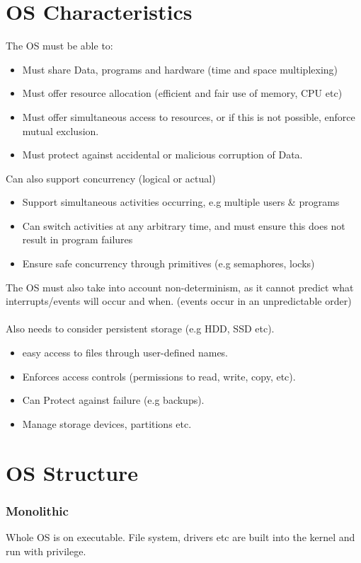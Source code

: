 \documentclass{report}
\begin{document}
    \section*{OS Characteristics}
        The OS must be able to:
        \begin{itemize}
            \item Must share Data, programs and hardware (time and space multiplexing)
            \item Must offer resource allocation (efficient and fair use of memory, CPU etc)
            \item Must offer simultaneous access to resources, or if this is not possible, enforce mutual exclusion.
            \item Must protect against accidental or malicious corruption of Data.
        \end{itemize}
        Can also support concurrency (logical or actual)
        \begin{itemize}
            \item Support simultaneous activities occurring, e.g multiple users \& programs 
            \item Can switch activities at any arbitrary time, and must ensure this does not result in program failures
            \item Ensure safe concurrency through primitives (e.g semaphores, locks)
        \end{itemize}
        The OS must also take into account non-determinism, as it cannot predict what interrupts/events will occur and when. (events occur in an unpredictable order)
        \\
        \\ Also needs to consider persistent storage (e.g HDD, SSD etc).
        \begin{itemize}
            \item easy access to files through user-defined names.
            \item Enforces access controls (permissions to read, write, copy, etc).
            \item Can Protect against failure (e.g backups).
            \item Manage storage devices, partitions etc.
        \end{itemize}
    \section*{OS Structure}
        \subsubsection*{Monolithic}
            Whole OS is on executable. File system, drivers etc are built into the kernel and run with privilege.
\end{document}
